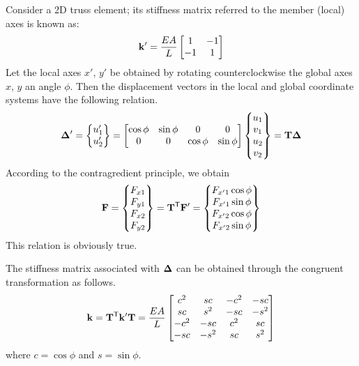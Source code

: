 \begin{example}
Consider a 2D truss element; its stiffness matrix referred to the member (local) axes is known as:
\begin{equation*}
  \mathbf{k}' = \frac{EA}{L}\begin{bmatrix}1 & -1\\ -1 & 1\end{bmatrix}
\end{equation*}
Let the local axes $x'$, $y'$ be obtained by rotating counterclockwise the global axes $x$, $y$ an angle $\phi$. Then the displacement vectors in the local and global coordinate systems have the following relation.
\begin{equation*}
  \bm{\Delta}' = \begin{Bmatrix}u_1'\\ u_2'\end{Bmatrix} = \begin{bmatrix}\cos\phi & \sin\phi & 0 & 0\\ 0 & 0 & \cos\phi & \sin\phi\end{bmatrix}\begin{Bmatrix}u_1\\ v_1\\ u_2\\ v_2\end{Bmatrix} = \mathbf{T}\bm{\Delta}
\end{equation*}
According to the contragredient principle, we obtain
\begin{equation*}
  \mathbf{F} = \begin{Bmatrix}F_{x1}\\ F_{y1}\\ F_{x2}\\ F_{y2}\end{Bmatrix} = \mathbf{T}^{\mathsf{T}}\mathbf{F}' = \begin{Bmatrix}F_{x'1}\cos\phi\\ F_{x'1}\sin\phi\\ F_{x'2}\cos\phi\\ F_{x'2}\sin\phi\end{Bmatrix}
\end{equation*}
This relation is obviously true.

The stiffness matrix associated with $\bm{\Delta}$ can be obtained through the congruent transformation as follows.
\begin{equation*}
  \mathbf{k} = \mathbf{T}^{\mathsf{T}}\mathbf{k}'\mathbf{T} = \frac{EA}{L}\begin{bmatrix}c^2 & sc & -c^2 & -sc\\ sc & s^2 & -sc & -s^2\\ -c^2 & -sc & c^2 & sc\\ -sc & -s^2 & sc & s^2\end{bmatrix}
\end{equation*}
where $c = \cos\phi$ and $s = \sin\phi$.
\end{example}

